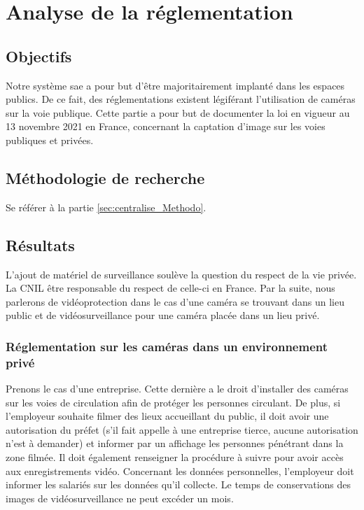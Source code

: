 \section{Analyse de la réglementation}
\label{sec:reglementation}

\subsection{Objectifs}
\label{sec:reglementation_Objectifs}

Notre système \gls{sae} a pour but d'être majoritairement implanté dans les espaces publics. 
De ce fait, des réglementations existent légiférant l'utilisation de caméras sur la voie publique.
Cette partie a pour but de documenter la loi en vigueur au 13 novembre 2021 en France, concernant la captation d'image sur les voies publiques et privées. 

\subsection{Méthodologie de recherche}
\label{sec:reglementation_Methodo}

Se référer à la partie \ref{sec:centralise_Methodo}.

\subsection{Résultats}
\label{sec:reglementation_resultats}

L'ajout de matériel de surveillance soulève la question du respect de la vie privée. La \gls{CNIL} être responsable du respect de celle-ci en France.
Par la suite, nous parlerons de vidéoprotection dans le cas d'une caméra se trouvant dans un lieu public 
et de vidéosurveillance pour une caméra placée dans un lieu privé.

\subsubsection{Réglementation sur les caméras dans un environnement privé}
\label{sec:reglementation_privee}

Prenons le cas d'une entreprise. Cette dernière a le droit d'installer des caméras sur les voies de circulation afin de protéger les personnes circulant.
De plus, si l'employeur souhaite filmer des lieux accueillant du public, il doit avoir une autorisation du préfet (s'il fait appelle à une entreprise tierce, aucune autorisation n'est à demander) 
et informer par un affichage les personnes pénétrant dans la zone filmée. Il doit également renseigner la procédure à suivre pour avoir accès aux enregistrements vidéo.
Concernant les données personnelles, l'employeur doit informer les salariés sur les données qu'il collecte. Le temps de conservations des images de vidéosurveillance ne peut excéder un mois.


